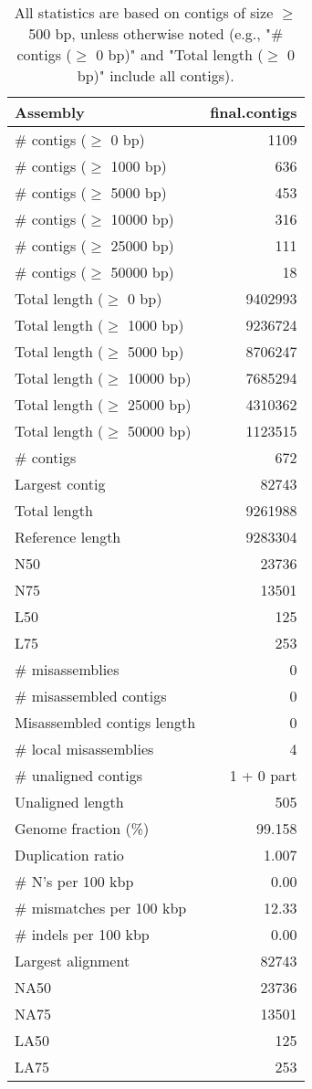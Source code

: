 \documentclass[12pt,a4paper]{article}
\begin{document}
\begin{table}[ht]
\begin{center}
\caption{All statistics are based on contigs of size $\geq$ 500 bp, unless otherwise noted (e.g., "\# contigs ($\geq$ 0 bp)" and "Total length ($\geq$ 0 bp)" include all contigs).}
\begin{tabular}{|l*{1}{|r}|}
\hline
Assembly & final.contigs \\ \hline
\# contigs ($\geq$ 0 bp) & 1109 \\ \hline
\# contigs ($\geq$ 1000 bp) & 636 \\ \hline
\# contigs ($\geq$ 5000 bp) & 453 \\ \hline
\# contigs ($\geq$ 10000 bp) & 316 \\ \hline
\# contigs ($\geq$ 25000 bp) & 111 \\ \hline
\# contigs ($\geq$ 50000 bp) & 18 \\ \hline
Total length ($\geq$ 0 bp) & 9402993 \\ \hline
Total length ($\geq$ 1000 bp) & 9236724 \\ \hline
Total length ($\geq$ 5000 bp) & 8706247 \\ \hline
Total length ($\geq$ 10000 bp) & 7685294 \\ \hline
Total length ($\geq$ 25000 bp) & 4310362 \\ \hline
Total length ($\geq$ 50000 bp) & 1123515 \\ \hline
\# contigs & 672 \\ \hline
Largest contig & 82743 \\ \hline
Total length & 9261988 \\ \hline
Reference length & 9283304 \\ \hline
N50 & 23736 \\ \hline
N75 & 13501 \\ \hline
L50 & 125 \\ \hline
L75 & 253 \\ \hline
\# misassemblies & 0 \\ \hline
\# misassembled contigs & 0 \\ \hline
Misassembled contigs length & 0 \\ \hline
\# local misassemblies & 4 \\ \hline
\# unaligned contigs & 1 + 0 part \\ \hline
Unaligned length & 505 \\ \hline
Genome fraction (\%) & 99.158 \\ \hline
Duplication ratio & 1.007 \\ \hline
\# N's per 100 kbp & 0.00 \\ \hline
\# mismatches per 100 kbp & 12.33 \\ \hline
\# indels per 100 kbp & 0.00 \\ \hline
Largest alignment & 82743 \\ \hline
NA50 & 23736 \\ \hline
NA75 & 13501 \\ \hline
LA50 & 125 \\ \hline
LA75 & 253 \\ \hline
\end{tabular}
\end{center}
\end{table}
\end{document}
